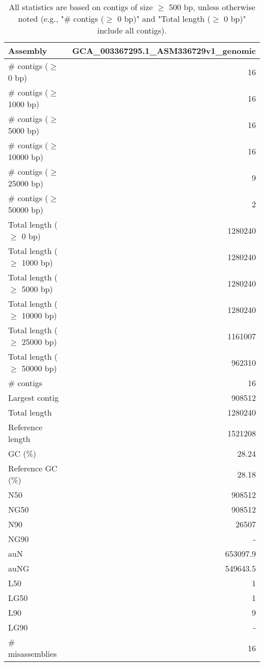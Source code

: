 \documentclass[12pt,a4paper]{article}
\begin{document}
\begin{table}[ht]
\begin{center}
\caption{All statistics are based on contigs of size $\geq$ 500 bp, unless otherwise noted (e.g., "\# contigs ($\geq$ 0 bp)" and "Total length ($\geq$ 0 bp)" include all contigs).}
\begin{tabular}{|l*{1}{|r}|}
\hline
Assembly & GCA\_003367295.1\_ASM336729v1\_genomic \\ \hline
\# contigs ($\geq$ 0 bp) & 16 \\ \hline
\# contigs ($\geq$ 1000 bp) & 16 \\ \hline
\# contigs ($\geq$ 5000 bp) & 16 \\ \hline
\# contigs ($\geq$ 10000 bp) & 16 \\ \hline
\# contigs ($\geq$ 25000 bp) & 9 \\ \hline
\# contigs ($\geq$ 50000 bp) & 2 \\ \hline
Total length ($\geq$ 0 bp) & 1280240 \\ \hline
Total length ($\geq$ 1000 bp) & 1280240 \\ \hline
Total length ($\geq$ 5000 bp) & 1280240 \\ \hline
Total length ($\geq$ 10000 bp) & 1280240 \\ \hline
Total length ($\geq$ 25000 bp) & 1161007 \\ \hline
Total length ($\geq$ 50000 bp) & 962310 \\ \hline
\# contigs & 16 \\ \hline
Largest contig & 908512 \\ \hline
Total length & 1280240 \\ \hline
Reference length & 1521208 \\ \hline
GC (\%) & 28.24 \\ \hline
Reference GC (\%) & 28.18 \\ \hline
N50 & 908512 \\ \hline
NG50 & 908512 \\ \hline
N90 & 26507 \\ \hline
NG90 & - \\ \hline
auN & 653097.9 \\ \hline
auNG & 549643.5 \\ \hline
L50 & 1 \\ \hline
LG50 & 1 \\ \hline
L90 & 9 \\ \hline
LG90 & - \\ \hline
\# misassemblies & 16 \\ \hline

\end{tabular}
\end{center}
\end{table}
\end{document}

